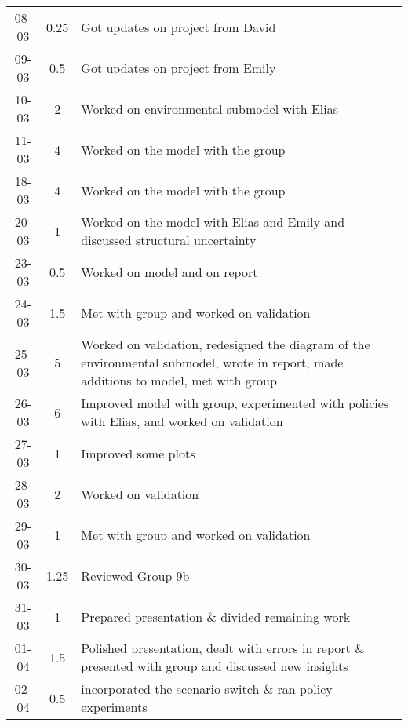 \begin{longtable}[c]{c|c|m{35em}}
08-03 & 0.25 & Got updates on project from David \\
09-03 & 0.5 & Got updates on project from Emily \\
10-03 & 2 & Worked on environmental submodel with Elias \\
11-03 & 4 & Worked on the model with the group \\
18-03 & 4  & Worked on the model with the group \\
20-03 & 1 & Worked on the model with Elias and Emily and discussed structural uncertainty \\
23-03 & 0.5 & Worked on model and on report \\
24-03 & 1.5 & Met with group and worked on validation \\
25-03 & 5 & Worked on validation, redesigned the diagram of the environmental submodel, wrote in report, made additions to model, met with group \\
26-03 & 6 & Improved model with group, experimented with policies with Elias, and worked on validation \\
27-03 & 1 & Improved some plots \\
28-03 & 2 & Worked on validation \\
29-03 & 1 & Met with group and worked on validation \\
30-03 & 1.25 & Reviewed Group 9b \\
31-03 & 1 & Prepared presentation \& divided remaining work \\
01-04 & 1.5 & Polished presentation, dealt with errors in report \& presented with group and discussed new insights \\
02-04  & 0.5 & incorporated the scenario switch \& ran policy experiments
\end{longtable}

